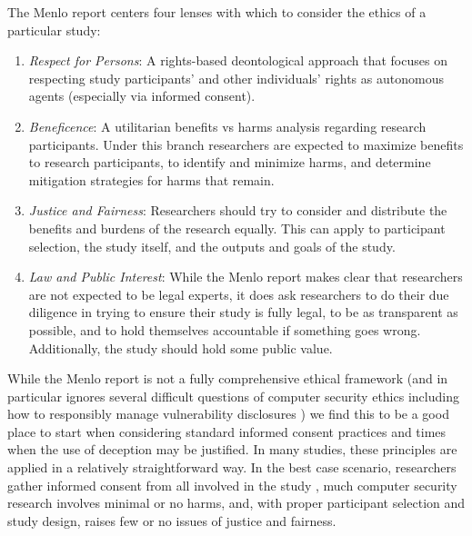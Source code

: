 The Menlo report centers four lenses with which to consider the ethics of a particular study:
\begin{enumerate}
\item \emph{Respect for Persons}: A rights-based deontological approach that focuses on respecting study participants' and other individuals' rights as autonomous agents (especially via informed consent).  
\item \emph{Beneficence}: A utilitarian benefits vs harms analysis regarding research participants. Under this branch researchers are expected to maximize benefits to research participants, to identify and minimize harms, and determine mitigation strategies for harms that remain.
\item \emph{Justice and Fairness}: Researchers should try to consider and distribute the benefits and burdens of the research equally. This can apply to participant selection, the study itself, and the outputs and goals of the study.
\item \emph{Law and Public Interest}: While the Menlo report makes clear that researchers are not expected to be legal experts, it does ask researchers to do their due diligence in trying to ensure their study is fully legal, to be as transparent as possible, and to hold themselves accountable if something goes wrong. Additionally, the study should hold some public value.
\end{enumerate}


While the Menlo report is not a fully comprehensive ethical framework (and in particular ignores several difficult questions of computer security ethics including how to responsibly manage vulnerability disclosures \cite{ISOIEC29147,householderCERTGuideCoordinated,FosteringResponsibleComputing})
we find this to be a good place to start when considering standard informed consent practices and times when the use of deception may be justified.
In many studies, these principles are applied in a relatively straightforward way.
In the best case scenario, researchers gather informed consent from all involved in the study \cite{menloReport,belmontReport,InformedConsentFAQs,cranorConferenceSubmissionReview},
much computer security research involves minimal or no harms, and, with proper participant selection and study design, raises few or no issues of justice and fairness.


